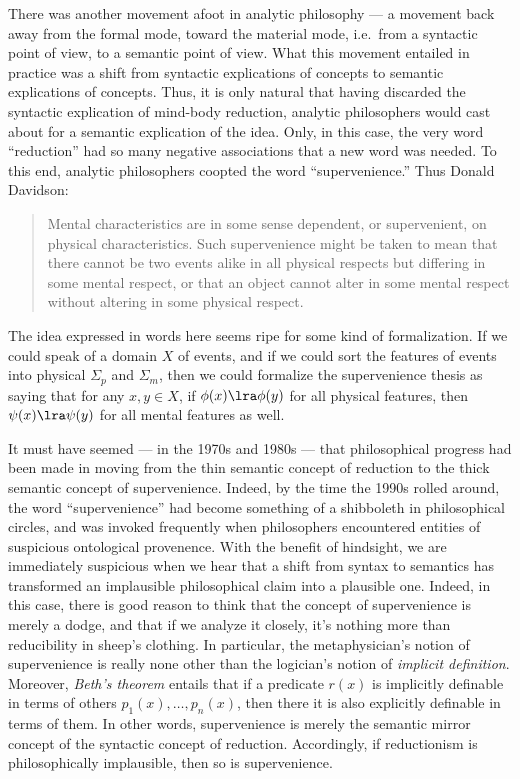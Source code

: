 There was another movement afoot in analytic philosophy --- a movement
back away from the formal mode, toward the material mode, i.e.\ from a
syntactic point of view, to a semantic point of view.  What this
movement entailed in practice was a shift from syntactic explications
of concepts to semantic explications of concepts.  Thus, it is only
natural that having discarded the syntactic explication of mind-body
reduction, analytic philosophers would cast about for a semantic
explication of the idea.  Only, in this case, the very word
``reduction'' had so many negative associations that a new word was
needed.  To this end, analytic philosophers coopted the word
``supervenience.''  Thus Donald Davidson:
\begin{quote} Mental characteristics are in some sense dependent, or
  supervenient, on physical characteristics.  Such supervenience might
  be taken to mean that there cannot be two events alike in all
  physical respects but differing in some mental respect, or that an
  object cannot alter in some mental respect without altering in some
  physical respect. \citep{davidson} \end{quote} The idea expressed in
words here seems ripe for some kind of formalization.  If we could
speak of a domain $X$ of events, and if we could sort the features of
events into physical $\Sigma _p$ and $\Sigma _m$, then we could
formalize the supervenience thesis as saying that for any $x,y\in X$,
if $\phi (x)\lra \phi (y)$ for all physical features, then
$\psi (x)\lra \psi (y)$ for all mental features as well.

It must have seemed --- in the 1970s and 1980s --- that philosophical
progress had been made in moving from the thin semantic concept of
reduction to the thick semantic concept of supervenience.  Indeed, by
the time the 1990s rolled around, the word ``supervenience'' had
become something of a shibboleth in philosophical circles, and was
invoked frequently when philosophers encountered entities of
suspicious ontological provenence.  With the benefit of hindsight, we
are immediately suspicious when we hear that a shift from syntax to
semantics has transformed an implausible philosophical claim into a
plausible one.  Indeed, in this case, there is good reason to think
that the concept of supervenience is merely a dodge, and that if we
analyze it closely, it's nothing more than reducibility in sheep's
clothing.  In particular, the metaphysician's notion of supervenience
is really none other than the logician's notion of \emph{implicit
  definition}.  Moreover, \emph{Beth's theorem} entails that if a
predicate $r(x)$ is implicitly definable in terms of others
$p_1(x),\dots ,p_n(x)$, then there it is also explicitly definable in
terms of them.  In other words, supervenience is merely the semantic
mirror concept of the syntactic concept of reduction.  Accordingly, if
reductionism is philosophically implausible, then so is supervenience.

